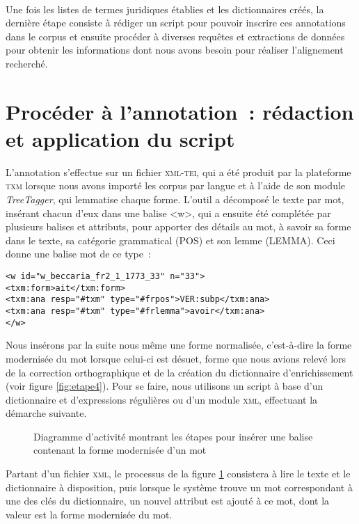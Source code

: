 \paragraph{}Une fois les listes de termes juridiques établies et les dictionnaires créés, la dernière étape consiste à rédiger un script pour pouvoir inscrire ces annotations dans le corpus et ensuite procéder à diverses requêtes et extractions de données pour obtenir les informations dont nous avons besoin pour réaliser l'alignement recherché.

\section{Procéder à l'annotation~: rédaction et application du script}
L'annotation s'effectue sur un fichier \textsc{xml-tei}, qui a été produit par la plateforme \textsc{txm} lorsque nous avons importé les corpus par langue et à l'aide de son module \emph{TreeTagger}, qui lemmatise chaque forme. L'outil a décomposé le texte par mot, insérant chacun d'eux dans une balise <w>, qui a ensuite été complétée par plusieurs balises et attributs, pour apporter des détails au mot, à savoir sa forme dans le texte, sa catégorie grammatical (POS) et son lemme (LEMMA). Ceci donne une balise mot de ce type~:
\begin{verbatim}
<w id="w_beccaria_fr2_1_1773_33" n="33">
<txm:form>ait</txm:form>
<txm:ana resp="#txm" type="#frpos">VER:subp</txm:ana>
<txm:ana resp="#txm" type="#frlemma">avoir</txm:ana>
</w>
\end{verbatim}
Nous insérons par la suite nous même une forme normalisée, c'est-à-dire la forme modernisée du mot lorsque celui-ci est désuet, forme que nous avions relevé lors de la correction orthographique et de la création du dictionnaire d'enrichissement (voir figure \ref{fig:etape4}). Pour se faire, nous utilisons un script à base d'un dictionnaire et d'expressions régulières ou d'un module \textsc{xml}, effectuant la démarche suivante.
\begin{figure}[H]
    \centering
    \caption{Diagramme d'activité montrant les étapes pour insérer une balise contenant la forme modernisée d'un mot}
    \label{fig:normalisation_txm}
\end{figure}
Partant d'un fichier \textsc{xml}, le processus de la figure \ref{fig:normalisation_txm} consistera à lire le texte et le dictionnaire à disposition, puis lorsque le système trouve un mot correspondant à une des clés du dictionnaire, un nouvel attribut est ajouté à ce mot, dont la valeur est la forme modernisée du mot. 

